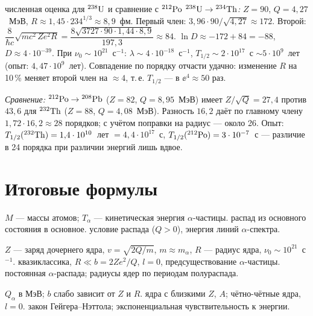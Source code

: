 \begin{derivation}[label=der:19:num]{численная оценка для $\nucl{U}{238}$ и сравнение с $\nucl{Po}{212}$}
\emph{$\nucl{U}{238}\to\nucl{Th}{234}$:} $Z=90$, $Q=4{,}27$~МэВ, $R\approx1{,}45\cdot234^{1/3}\approx8{,}9$~фм.
Первый член: $3{,}96\cdot90/\sqrt{4{,}27}\approx172$. Второй: $\dfrac{8}{\hbar c}\sqrt{mc^2\,Ze^2R}=\dfrac{8\sqrt{3727\cdot90\cdot1{,}44\cdot8{,}9}}{197{,}3}\approx84$.
$\ln D\approx-172+84=-88$, $D\approx4\cdot10^{-39}$. При $\nu_0\sim10^{21}$~с$^{-1}$: $\lambda\sim4\cdot10^{-18}$~с$^{-1}$,
$T_{1/2}\sim2\cdot10^{17}$~с $\sim5\cdot10^9$~лет (опыт: $4{,}47\cdot10^9$~лет). Совпадение по порядку отчасти удачно: изменение $R$ на 10\,\%
меняет второй член на $\approx4$, т.\,е. $T_{1/2}$ — в $\ee^4\approx50$ раз.

\emph{Сравнение:} $\nucl{Po}{212}\to\nucl{Pb}{208}$ ($Z=82$, $Q=8{,}95$~МэВ) имеет $Z/\sqrt Q=27{,}4$ против $43{,}6$ для $\nucl{Th}{232}$ ($Z=88$, $Q=4{,}08$~МэВ).
Разность $16{,}2$ даёт по главному члену $1{,}72\cdot16{,}2\approx28$ порядков; с учётом поправки на радиус — около 26. Опыт:
$T_{1/2}(\nucl{Th}{232})=1{,}4\cdot10^{10}$~лет $=4{,}4\cdot10^{17}$~с, $T_{1/2}(\nucl{Po}{212})=3\cdot10^{-7}$~с — различие в 24 порядка при различии энергий
лишь вдвое.
\end{derivation}

\section{Итоговые формулы}

 {$M$ — массы атомов; $T_\alpha$ — кинетическая энергия $\alpha$-частицы.}
 {распад из основного состояния в основное.}
 {условие распада ($Q>0$), энергия линий $\alpha$-спектра.}

 {$Z$ — заряд дочернего ядра, $v=\sqrt{2Q/m}$, $m\approx m_\alpha$, $R$ — радиус ядра, $\nu_0\sim10^{21}$~с$^{-1}$.}
 {квазиклассика, $R\ll b=2Ze^2/Q$, $l=0$, предсуществование $\alpha$-частицы.}
 {постоянная $\alpha$-распада; радиусы ядер по периодам полураспада.}

 {$Q_\alpha$ в МэВ; $b$ слабо зависит от $Z$ и $R$.}
 {ядра с близкими $Z$, $A$; чётно-чётные ядра, $l=0$.}
 {закон Гейгера--Нэттола; экспоненциальная чувствительность к энергии.}


